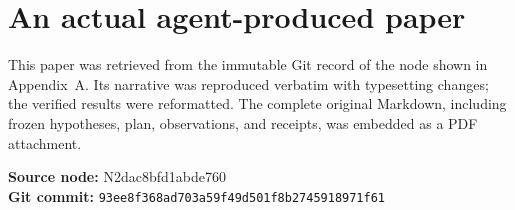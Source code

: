 \documentclass[11pt,a4paper]{article}
\begin{document}
\newpage
\section{An actual agent-produced paper}\label{app:paper}
This paper was retrieved from the immutable Git record of the node shown in Appendix~A. Its narrative was reproduced verbatim with typesetting changes; the verified results were reformatted. The complete original Markdown, including frozen hypotheses, plan, observations, and receipts, was embedded as a PDF attachment.

{\small\color{muted}\textbf{Source node:} N2dac8bfd1abde760\\
\textbf{Git commit:} \nolinkurl{93ee8f368ad703a59f49d501f8b2745918971f61}}

\end{document}
